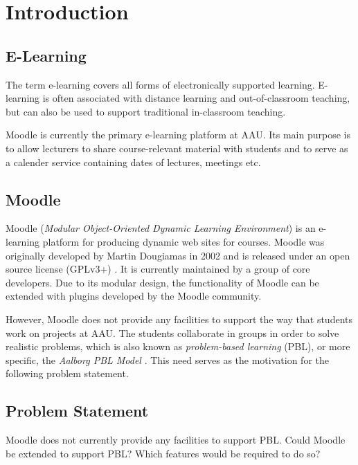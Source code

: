 \chapter{Introduction}

\section{E-Learning}
The term e-learning covers all forms of electronically supported learning. E-learning is often associated with distance learning and out-of-classroom teaching, but can also be used to support traditional in-classroom teaching.

Moodle is currently the primary e-learning platform at AAU. Its main purpose is to allow lecturers to share course-relevant material with students and to serve as a calender service containing dates of lectures, meetings etc.

\section{Moodle}
Moodle (\emph{Modular Object-Oriented Dynamic Learning Environment}) \citep{moodle} is an e-learning platform for producing dynamic web sites for courses. Moodle was originally developed by Martin Dougiamas in 2002 and is released under an open source license (GPLv3+) \citep{gpl}. It is currently maintained by a group of core developers. Due to its modular design, the functionality of Moodle can be extended with plugins developed by the Moodle community.

However, Moodle does not provide any facilities to support the way that students work on projects at AAU. The students collaborate in groups in order to solve realistic problems, which is also known as \emph{problem-based learning} (PBL), or more specific, the \emph{Aalborg PBL Model} \citep{pbl}. This need serves as the motivation for the following problem statement.

\section{Problem Statement}
Moodle does not currently provide any facilities to support PBL. Could Moodle be extended to support PBL? Which features would be required to do so?